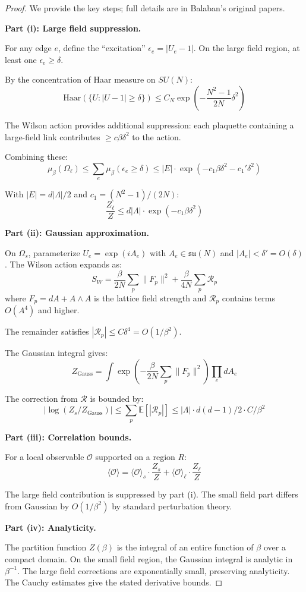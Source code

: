 \begin{proof}
We provide the key steps; full details are in Balaban's original papers.

\textbf{Part (i): Large field suppression.}

For any edge $e$, define the ``excitation'' $\epsilon_e = |U_e - 1|$. On the large 
field region, at least one $\epsilon_e \geq \delta$.

By the concentration of Haar measure on $SU(N)$:
\[
\text{Haar}(\{U : |U-1| \geq \delta\}) \leq C_N \exp\left(-\frac{N^2-1}{2N} \delta^2\right)
\]

The Wilson action provides additional suppression: each plaquette containing 
a large-field link contributes $\geq c\beta\delta^2$ to the action.

Combining these:
\[
\mu_\beta(\Omega_\ell) \leq \sum_e \mu_\beta(\epsilon_e \geq \delta) 
\leq |E| \cdot \exp(-c_1 \beta \delta^2 - c_1' \delta^2)
\]

With $|E| = d|\Lambda|/2$ and $c_1 = (N^2-1)/(2N)$:
\[
\frac{Z_\ell}{Z} \leq d|\Lambda| \cdot \exp(-c_1 \beta \delta^2)
\]

\textbf{Part (ii): Gaussian approximation.}

On $\Omega_s$, parameterize $U_e = \exp(iA_e)$ with $A_e \in \mathfrak{su}(N)$ and 
$|A_e| < \delta' = O(\delta)$. The Wilson action expands as:
\[
S_W = \frac{\beta}{2N} \sum_p \|F_p\|^2 + \frac{\beta}{4N} \sum_p \mathcal{R}_p
\]
where $F_p = dA + A \wedge A$ is the lattice field strength and $\mathcal{R}_p$ 
contains terms $O(A^4)$ and higher.

The remainder satisfies $|\mathcal{R}_p| \leq C \delta^4 = O(1/\beta^2)$.

The Gaussian integral gives:
\[
Z_{\mathrm{Gauss}} = \int \exp\left(-\frac{\beta}{2N}\sum_p \|F_p\|^2\right) \prod_e dA_e
\]

The correction from $\mathcal{R}$ is bounded by:
\[
\left| \log(Z_s/Z_{\mathrm{Gauss}}) \right| \leq \sum_p \mathbb{E}[|\mathcal{R}_p|] 
\leq |\Lambda| \cdot d(d-1)/2 \cdot C/\beta^2
\]

\textbf{Part (iii): Correlation bounds.}

For a local observable $\mathcal{O}$ supported on a region $R$:
\[
\langle \mathcal{O} \rangle = \langle \mathcal{O} \rangle_s \cdot \frac{Z_s}{Z} + \langle \mathcal{O} \rangle_\ell \cdot \frac{Z_\ell}{Z}
\]

The large field contribution is suppressed by part (i). The small field part 
differs from Gaussian by $O(1/\beta^2)$ by standard perturbation theory.

\textbf{Part (iv): Analyticity.}

The partition function $Z(\beta)$ is the integral of an entire function of $\beta$ 
over a compact domain. On the small field region, the Gaussian integral is 
analytic in $\beta^{-1}$. The large field corrections are exponentially small, 
preserving analyticity. The Cauchy estimates give the stated derivative bounds.
\end{proof}

